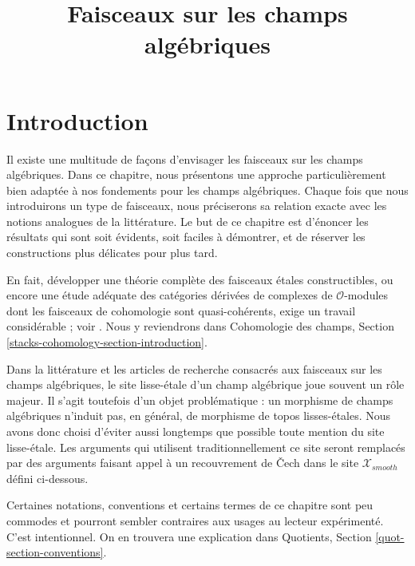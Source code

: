 

%


\title{Faisceaux sur les champs algébriques}


\maketitle

\label{section-phantom}

\tableofcontents

\section{Introduction}
\label{section-introduction}

\noindent
Il existe une multitude de façons d'envisager les faisceaux sur les champs algébriques.
Dans ce chapitre, nous présentons une approche particulièrement bien
adaptée à nos fondements pour les champs algébriques. Chaque fois que nous introduirons
un type de faisceaux, nous préciserons sa relation exacte avec les
notions analogues de la littérature.
Le but de ce chapitre est d'énoncer les résultats
qui sont soit évidents, soit faciles à démontrer,
et de réserver les constructions plus délicates pour plus tard.

\medskip\noindent
En fait, développer une théorie complète des faisceaux étales
constructibles, ou encore une étude adéquate des catégories dérivées
de complexes de $\mathcal{O}$-modules dont les faisceaux de cohomologie sont
quasi-cohérents, exige un travail considérable ; voir
\cite{olsson_sheaves}. Nous y reviendrons dans
Cohomologie des champs, Section \ref{stacks-cohomology-section-introduction}.

\medskip\noindent
Dans la littérature et les articles de recherche consacrés aux faisceaux sur les champs
algébriques, le site lisse-étale d'un champ algébrique joue souvent un rôle majeur.
Il s'agit toutefois d'un objet problématique : un morphisme de
champs algébriques n'induit pas, en général, de morphisme de topos lisses-étales. Nous avons
donc choisi d'éviter aussi longtemps que possible toute mention du site
lisse-étale. Les arguments qui utilisent traditionnellement ce site
seront remplacés par des arguments faisant appel à un recouvrement de {\v C}ech
dans le site $\mathcal{X}_{smooth}$ défini ci-dessous.

\medskip\noindent
Certaines notations, conventions et certains termes de ce chapitre sont peu commodes
et pourront sembler contraires aux usages au lecteur expérimenté. C'est intentionnel.
On en trouvera une explication dans Quotients, Section
\ref{quot-section-conventions}.




